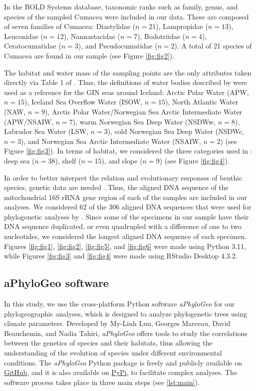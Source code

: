 In the BOLD Systems database, taxonomic ranks such as family, genus, and species of the sampled Cumacea were included in our data. These are composed of seven families of Cumacea: Diastylidae ($n=21$), Lampropidae ($n=13$), Leuconidae ($n=12$), Nannastacidae ($n=7$), Bodotriidae ($n=4$), Ceratocumatidae ($n=3$), and Pseudocumatidae ($n=2$). A total of 21 species of Cumacea are found in our sample (see Figure \ref{fig:fig2}).

The habitat and water mass of the sampling points are the only attributes taken directly via Table 1 of \cite{uhlir_adding_2021}. Thus, the definitions of water bodies described by \cite{hansen_north_2000, brix2010distribution, ostmann_marine_2014} were used as a reference for the GIN seas around Iceland: Arctic Polar Water (APW, $n=15$), Iceland Sea Overflow Water (ISOW, $n=15$), North Atlantic Water (NAW, $n=9$), Arctic Polar Water/Norwegian Sea Arctic Intermediate Water (APW/NSAIW, $n=7$), warm Norwegian Sea Deep Water (NSDWw, $n=8$), Labrador Sea Water (LSW, $n=3$), cold Norwegian Sea Deep Water (NSDWc, $n=3$), and Norwegian Sea Arctic Intermediate Water (NSAIW, $n=2$) (see Figure \ref{fig:fig3}). In terms of habitat, we considered the three categories used in \cite{uhlir_adding_2021}: deep sea ($n=38$), shelf ($n=15$), and slope ($n=9$) (see Figure \ref{fig:fig4}).

In order to better interpret the relation and evolutionary responses of benthic species, genetic data are needed \citep{wilson_speciation_1987, uhlir_adding_2021}. Thus, the aligned DNA sequence of the mitochondrial 16S rRNA gene region of each of the samples are included in our analyses. We considered 62 of the 306 aligned DNA sequences that were used for phylogenetic analyses by \cite{uhlir_adding_2021}. Since some of the specimens in our sample have their DNA sequence duplicated, or even quadrupled with a difference of one to two nucleotides, we considered the longest aligned DNA sequence of each specimen. Figures \ref{fig:fig1}, \ref{fig:fig2}, \ref{fig:fig5}, and \ref{fig:fig6} were made using Python 3.11, while Figures \ref{fig:fig3} and \ref{fig:fig4} were made using RStudio Desktop 4.3.2.

\subsection{aPhyloGeo software}

In this study, we use the cross-platform Python software \textit{aPhyloGeo} for our phylogeographic analyses, which is designed to analyze phylogenetic trees using climate parameters. Developed by My-Linh Luu, Georges Marceau, David Beauchemin, and Nadia Tahiri, \textit{aPhyloGeo} offers tools to study the correlations between the genetics of species and their habitats, thus allowing the understanding of the evolution of species under different environmental conditions. The \textit{aPhyloGeo} Python package is freely and publicly available on \href{https://github.com/tahiri-lab/aPhyloGeo}{GitHub}, and it is also available on \href{https://pypi.org/project/aphylogeo/}{PyPi}, to facilitate complex analyses. The software process takes place in three main steps (see \autoref{lst:main}).


